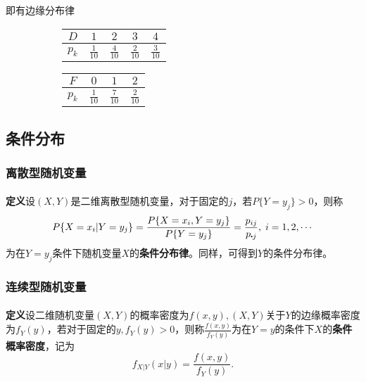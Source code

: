 即有边缘分布律
\bgroup
\def\arraystretch{2}
\setlength\tabcolsep{0.5cm}
\begin{figure}[H]
\centering
\begin{subfigure}[t]{0.48\linewidth}
  \centering
    \begin{tabular}{c|cccc}
      \hline
      $D$ & $1$ & $2$ & $3$ & $4$ \\
      \hline
      $p_k$ & $\frac{1}{10}$ & $\frac{4}{10}$ & $\frac{2}{10}$ & $\frac{3}{10}$ \\
      \hline
    \end{tabular}
\end{subfigure}
\begin{subfigure}[t]{0.48\linewidth}
  \centering
    \begin{tabular}{c|ccc}
      \hline
      $F$ & $0$ & $1$ & $2$ \\
      \hline
      $p_k$ & $\frac{1}{10}$ & $\frac{7}{10}$ & $\frac{2}{10}$ \\
      \hline
    \end{tabular}
\end{subfigure}
\end{figure}
\egroup

\subsection{条件分布}
\subsubsection{离散型随机变量}
\paragraph{}
\textbf{定义\;}设$(X,Y)$是二维离散型随机变量，对于固定的$j$，若$P\{Y=y_j\}>0$，则称
\begin{equation}
  P\{X=x_i|Y=y_j\} = \frac{P\{X=x_i,Y=y_j\}}{P\{Y=y_j\}} = \frac{p_{ij}}{p_{\bigcdot j}}, \; i = 1,2,\cdots
\end{equation}
为在$Y=y_j$条件下随机变量$X$的\textbf{条件分布律}。同样，可得到$Y$的条件分布律。

\subsubsection{连续型随机变量}
\paragraph{}
\textbf{定义\;}设二维随机变量$(X,Y)$的概率密度为$f(x,y), (X,Y)$关于$Y$的边缘概率密度为$f_Y(y)$，若对于固定的$y, f_Y (y)>0$，则称$\frac{f(x,y)}{f_Y(y)}$为在$Y=y$的条件下$X$的\textbf{条件概率密度}，记为
\begin{equation}
  f_{X|Y}(x|y) = \frac{f(x,y)}{f_Y(y)}.
\end{equation}

